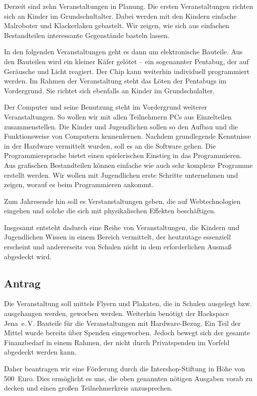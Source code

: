 \documentclass{scrartcl}
\begin{document}
Derzeit sind zehn Veranstaltungen in Planung. Die ersten Veranstaltungen
richten sich an Kinder im Grundschultalter. Dabei werden mit den Kindern
einfache Malroboter und Klackerlaken gebastelt. Wir zeigen, wie sich aus
einfachen Bestandteilen interessante Gegenstände basteln lassen.

In den folgenden Veranstaltungen geht es dann um elektronische Bauteile.
Aus den Bauteilen wird ein kleiner Käfer gelötet -- ein sogenannter Pentabug,
der auf Geräusche und Licht reagiert. Der Chip kann weiterhin individuell
programmiert werden. Im Rahmen der Veranstaltung steht das Löten der
Pentabugs im Vordergrund. Sie richtet sich ebenfalls an Kinder im
Grundschulalter.

Der Computer und seine Benutzung steht im Vordergrund weiterer
Veranstaltungen. So wollen wir mit allen Teilnehmern PCs aus Einzelteilen
zusammenstellen. Die Kinder und Jugendlichen sollen so den Aufbau und die
Funktionsweise von Computern kennenlernen. Nachdem grundlegende Kenntnisse in
der Hardware vermittelt wurden, soll es an die Software gehen. Die
Programmiersprache bietet einen spielerischen Einstieg in das
Programmieren. Aus grafischen Bestandteilen können einfache wie auch sehr
komplexe Programme erstellt werden. Wir wollen mit Jugendlichen erste
Schritte unternehmen und zeigen, worauf es beim Programmieren ankommt.

Zum Jahresende hin soll es Verstanstaltungen geben, die auf Webtechnologien
eingehen und solche die sich mit physikalischen Effekten beschäftigen.

Insgesamt entsteht dadurch eine Reihe von Veranstaltungen, die Kindern und
Jugendlichen Wissen in einem Bereich vermittelt, der heutzutage essenziell
erscheint und andererseits von Schulen nicht in dem erforderlichen Ausmaß
abgedeckt wird.

\subsection{Antrag}
\label{sec:orgheadline4}
Die Veranstaltung soll mittels Flyern und Plakaten, die in Schulen ausgelegt
bzw. ausgehangen werden, geworben werden. Weiterhin benötigt der Hackspace
Jena~e.\,V. Bauteile für die Veranstaltungen mit Hardware-Bezug. Ein Teil
der Mittel wurde bereits über Spenden eingeworben. Jedoch bewegt sich der
gesamte Finanzbedarf in einem Rahmen, der nicht durch Privatspenden im
Vorfeld abgedeckt werden kann.

Daher beantragen wir eine Förderung durch die Intershop-Stiftung in Höhe von
500~Euro. Dies ermöglicht es uns, die oben genannten nötigen Ausgaben
vorab zu decken und einen großen Teilnehmerkreis anzusprechen.
\end{document}
